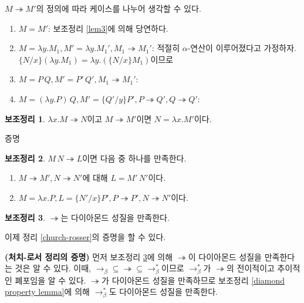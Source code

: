 \documentclass[b5paper]{book}
\theoremstyle{definition}
\newtheorem{lem}{보조정리}[chapter]
\newenvironment{pf*}{\pushQED{\qed}\pf}{\popQED\endpf}
\begin{document}
\begin{pf*}
    $M \twoheadrightarrow M'$의 정의에 따라 케이스를 나누어 생각할 수 있다.
    \begin{enumerate}
        \item $M = M'$: 보조정리 \ref{lem3}에 의해 당연하다.
        \item $M = \lambda y. M_1, M' = \lambda y. M_1', M_1 \twoheadrightarrow M_1'$:
        적절히 $\alpha$-연산이 이루어졌다고 가정하자. $ \{N / x\}(\lambda y. M_1) = 
        \lambda y. (\{N / x\} M_1)$이므로
        \item $ M = P \, Q, M' = P' \, Q', M_1 \twoheadrightarrow M_1' $:
        
        \item $M = (\lambda y. P) \, Q, M' = \{Q' / y\} P' , P \twoheadrightarrow Q' , Q \twoheadrightarrow Q'$:
        
    \end{enumerate}
\end{pf*}
\begin{lem}
   $\lambda x. M \twoheadrightarrow N$이고 $M \twoheadrightarrow M'$이면
   $N = \lambda x.M'$이다.
\end{lem}
\begin{pf*}
    증명
\end{pf*}
\begin{lem}
    $M \, N \twoheadrightarrow L$이면 다음 중 하나를 만족한다.
    \begin{enumerate}
        \item $M \twoheadrightarrow M', N \twoheadrightarrow N'$에 대해 $L = M' \, N'$이다.
        \item $M = \lambda x. P, L = \{N' / x\} P', P \twoheadrightarrow P', 
        N \twoheadrightarrow N'$이다.
    \end{enumerate}
\end{lem}
\begin{pf*}
\end{pf*}
\begin{lem} \label{twohead diamond}
    $\twoheadrightarrow$는 다이아몬드 성질을 만족한다.
\end{lem}
\begin{pf*}
\end{pf*}
이제 정리 \ref{church-rosser}의 증명을 할 수 있다. 
\begin{pf*} 
    \textbf{(처치-로서 정리의 증명)} 먼저 보조정리 \ref{twohead diamond}에 의해 $\twoheadrightarrow$이
    다이아몬드 성질을 만족한다는 것은 알 수 있다. 이때, $\rightarrow_\beta \subseteq \twoheadrightarrow
    \subseteq \rightarrow_\beta^*$이므로 $\rightarrow_\beta^*$가 $\twoheadrightarrow$의 전이적이고
    추이적인 폐포임을 알 수 있다. $\twoheadrightarrow$가 다이아몬드 성질을 만족하므로 보조정리 
    \ref{diamond property lemma}에 의해 $\rightarrow_\beta^*$도 다이아몬드 성질을 만족한다.
\end{pf*}
\end{document}
